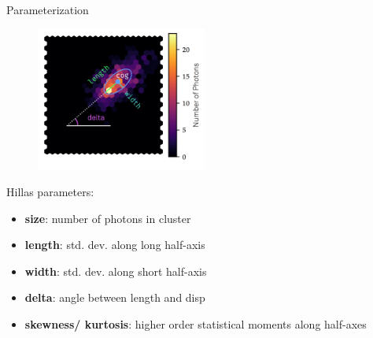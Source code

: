 \begin{frame}[t]{Parameterization}
    \begin{multicols}{2}
        \begin{figure}
            \centering
            \includegraphics[width=0.5\textwidth]{fig/hillas.png}
        \end{figure}
    \columnbreak
Hillas parameters: \\
    \begin{itemize}
        \setlength\itemsep{1em}
        \item \textbf{{\color{tugreen} size}}: number of photons in cluster 
        \item \textbf{{\color{tugreen} length}}: std. dev. along long half-axis
        \item \textbf{{\color{tugreen} width}}: std. dev. along short half-axis
        \item \textbf{{\color{tugreen} delta}}: angle between length and disp
        \item \textbf{{\color{tugreen} skewness/ kurtosis}}: higher order statistical moments along half-axes
    \end{itemize}
    \end{multicols}
\end{frame}

